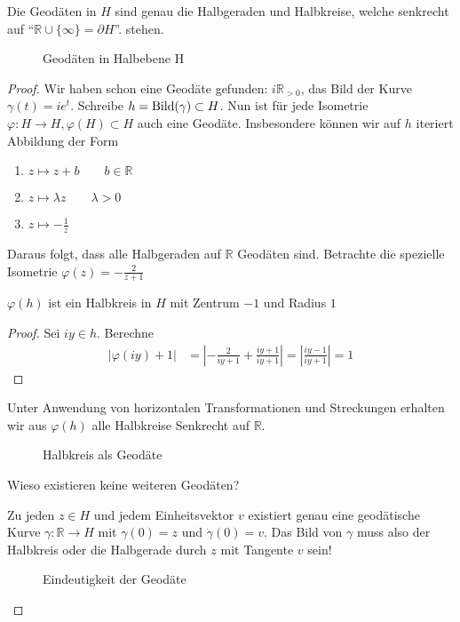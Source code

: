 \documentclass[../main.tex]{subfiles}
\begin{document}
\begin{proposition}
    Die Geodäten in $H$ sind genau die Halbgeraden und Halbkreise, welche senkrecht auf ``$\mathbb{R} \cup \{\infty \} = \partial H$''.
    stehen. 
\end{proposition}

\begin{figure}[htb]
    \centering
    \def\svgwidth{20em}
    
    \caption*{Geodäten in Halbebene H}        
\end{figure}

\begin{proof}
    Wir haben schon eine Geodäte gefunden:
    $i \mathbb{R}_{>0} $, das Bild der Kurve $\gamma (t) = ie^t$.
    Schreibe $h = \operatorname{Bild} (\gamma) \subset H$. Nun ist für jede Isometrie
    $\varphi : H \to H, \varphi (H) \subset H$ auch eine Geodäte. Insbesondere
    können wir auf $h$ iteriert Abbildung der Form
    \begin{enumerate}
        \item $z \mapsto z + b \qquad b \in \mathbb{R}$
        \item $z \mapsto \lambda z \qquad \lambda > 0$
        \item $z \mapsto -\frac{1}{z}$
    \end{enumerate}
    Daraus folgt, dass alle Halbgeraden auf $\mathbb{R}$ Geodäten sind.
    Betrachte die spezielle Isometrie $\varphi (z)=-\frac{2}{z+1}$
    \begin{claim}
        $\varphi (h)$ ist ein Halbkreis in $H$ mit Zentrum $-1$ und Radius $1$
    \end{claim}
    \begin{proof}
        Sei $i y \in h$. Berechne
        \begin{align*}
            |\varphi(iy)+1| &= \left| -\frac{2}{iy+1} + \frac{iy+1}{iy+1} \right| = \left| \frac{iy -1}{iy+1} \right| = 1
        \end{align*}\end{proof}
    Unter Anwendung von horizontalen Transformationen und Streckungen erhalten wir aus $\varphi(h)$
    alle Halbkreise Senkrecht auf $\mathbb{R}$.
    \begin{figure}[htb]
        \centering
        \def\svgwidth{20em}
        
        \caption*{Halbkreis als Geodäte}        
    \end{figure}

    \begin{question}
        Wieso existieren keine weiteren Geodäten?
    \end{question}
    Zu jeden $z \in H$ und jedem Einheitsvektor $v$ existiert genau eine geodätische Kurve $\gamma : \mathbb{R} \to H$
    mit $\gamma (0) = z$ und $\dot{\gamma} (0) = v$. Das Bild von $\gamma$ muss also der Halbkreis
    oder die Halbgerade durch $z$ mit Tangente $v$ sein!
    \begin{figure}[htb]
        \centering
        \def\svgwidth{10em}
        
        \caption*{Eindeutigkeit der Geodäte}        
    \end{figure}
\end{proof}
\end{document}
